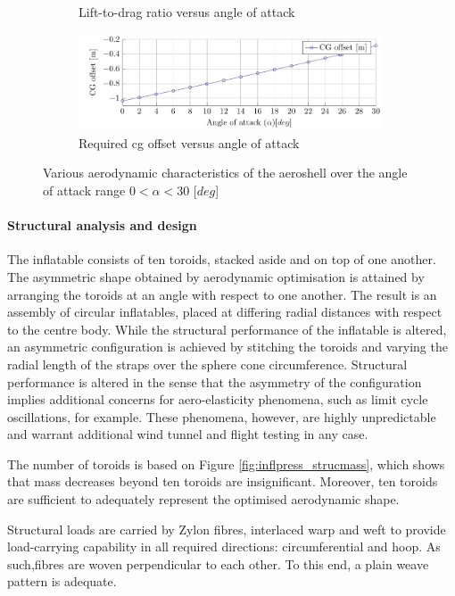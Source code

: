 \begin{figure}[h]
\begin{subfigure}[b]{0.49\textwidth}
 		\caption{Lift-to-drag ratio versus angle of attack}
 		\label{fig:CLCDAlpha}
 	\end{subfigure}
 	\begin{subfigure}[b]{0.49\textwidth}
 		\includegraphics[width=0.99\textwidth]{./Figure/Aerodynamics/CGoAlpha.pdf}
 		\caption{Required \gls{cg} offset versus angle of attack}
 		\label{fig:CGOAlpha}
 	\end{subfigure}
 	\caption{Various aerodynamic characteristics of the aeroshell over the angle of attack range $0<\alpha<30$ [$deg$]}
 \end{figure}


\paragraph{Structural analysis and design}


The inflatable consists of ten toroids, stacked aside and on top of one another. The asymmetric shape obtained by aerodynamic optimisation is attained by arranging the toroids at an angle with respect to one another. The result is an assembly of circular inflatables, placed at differing radial distances with respect to the centre body. While the structural performance of the inflatable is altered, an asymmetric configuration is achieved by stitching the toroids and varying the radial length of the straps over the sphere cone circumference. Structural performance is altered in the sense that the asymmetry of the configuration implies additional concerns for aero-elasticity phenomena, such as limit cycle oscillations, for example. These phenomena, however, are highly unpredictable and warrant additional wind tunnel and flight testing in any case. 

The number of toroids is based on Figure \ref{fig:inflpress_strucmass}, which shows that mass decreases beyond ten toroids are insignificant. Moreover, ten toroids are sufficient to adequately represent the optimised aerodynamic shape. 

Structural loads are carried by Zylon fibres, interlaced warp and weft to provide load-carrying capability in all required directions: circumferential and hoop. As such,fibres are woven perpendicular to each other. To this end, a plain weave pattern is adequate.

